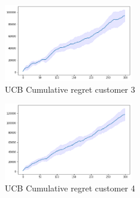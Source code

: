 \begin{multicols}{2}
    \begin{figure}[H]
        \begin{center}
        \includegraphics[width=0.5\textwidth]{img/ucb7_3cum_reg.png}
        \caption{UCB Cumulative regret customer 3}
        \label{fig:cum_reg73}
        \end{center}
    \end{figure}
    \columnbreak
    \begin{figure}[H]
        \begin{center}
        \includegraphics[width=0.5\textwidth]{img/ucb7_4cum_reg.png}
        \caption{UCB Cumulative regret customer 4}
        \label{fig:cum_reg74}
        \end{center}
    \end{figure}
\end{multicols}
\newpage
